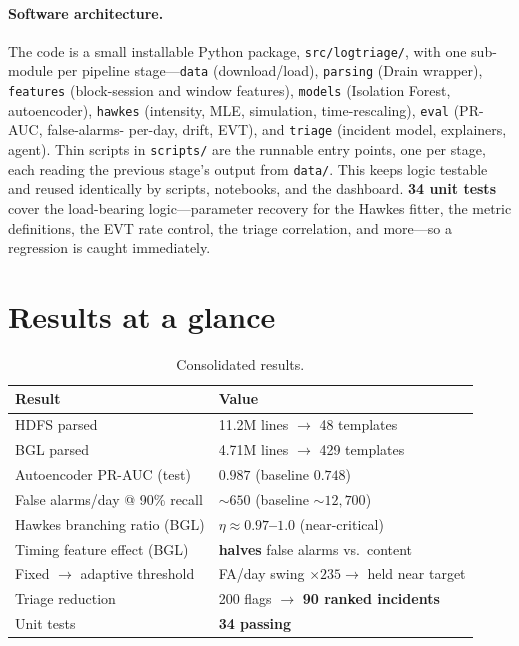 \documentclass[11pt,a4paper]{article}
\newcommand{\ours}[1]{{\color{good}\textbf{#1}}}
\newcommand{\code}[1]{\texttt{\small #1}}
\begin{document}
\paragraph{Software architecture.} The code is a small installable Python package,
\code{src/logtriage/}, with one sub-module per pipeline stage---\code{data}
(download/load), \code{parsing} (Drain wrapper), \code{features} (block-session
and window features), \code{models} (Isolation Forest, autoencoder), \code{hawkes}
(intensity, MLE, simulation, time-rescaling), \code{eval} (PR-AUC, false-alarms-
per-day, drift, EVT), and \code{triage} (incident model, explainers, agent). Thin
scripts in \code{scripts/} are the runnable entry points, one per stage, each
reading the previous stage's output from \code{data/}. This keeps logic testable
and reused identically by scripts, notebooks, and the dashboard.
\textbf{34 unit tests} cover the load-bearing logic---parameter recovery for the
Hawkes fitter, the metric definitions, the EVT rate control, the triage
correlation, and more---so a regression is caught immediately.

\section{Results at a glance}
\label{sec:results}

\begin{table}[H]
\centering
\caption{Consolidated results.}
\small
\renewcommand{\arraystretch}{1.2}
\begin{tabular}{@{}l l@{}}
\toprule
Result & Value \\
\midrule
HDFS parsed & 11.2M lines $\to$ 48 templates \\
BGL parsed & 4.71M lines $\to$ 429 templates \\
Autoencoder PR-AUC (test) & \ours{$0.987$} \; (baseline $0.748$) \\
False alarms/day @ 90\% recall & \ours{$\sim$$650$} \; (baseline $\sim$$12{,}700$) \\
Hawkes branching ratio (BGL) & \ours{$\eta\approx0.97$--$1.0$} (near-critical) \\
Timing feature effect (BGL) & \ours{halves} false alarms vs.\ content \\
Fixed $\to$ adaptive threshold & FA/day swing $\times235 \to$ held near target \\
Triage reduction & 200 flags $\to$ \ours{90 ranked incidents} \\
Unit tests & \textbf{34 passing} \\
\bottomrule
\end{tabular}
\end{table}
\end{document}
